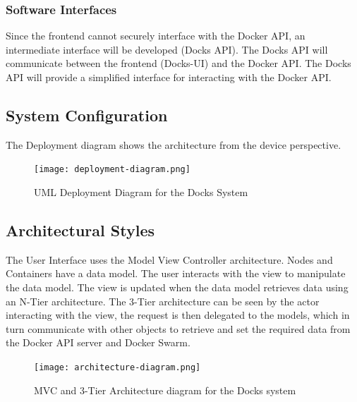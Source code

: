 \documentclass[]{article}
\begin{document}
\subsubsection{Software Interfaces}
Since the frontend cannot securely interface with the Docker API,
an intermediate interface will be developed (Docks API).
The Docks API will communicate between the frontend (Docks-UI) and
the Docker API. The Docks API will provide a simplified interface for
interacting with the Docker API.


\subsection{System Configuration}
The Deployment diagram shows the architecture from the device perspective.

\begin{figure}[H]
	\centering
	\texttt{[image: deployment-diagram.png]}
	\caption{UML Deployment Diagram for the Docks System}
\end{figure}

\subsection{Architectural Styles}

The User Interface uses the Model View Controller architecture.
Nodes and Containers have a data model.
The user interacts with the view to manipulate the data model.
The view is updated when the data model retrieves data using an N-Tier architecture.
The 3-Tier architecture can be seen by the actor interacting with the view,
the request is then delegated to the models, which in turn
communicate with other objects to retrieve and set the required data from
the Docker API server and Docker Swarm.

\begin{figure}[h]
	\centering
	\texttt{[image: architecture-diagram.png]}
	\caption{MVC and 3-Tier Architecture diagram for the Docks system}
\end{figure}
\end{document}

